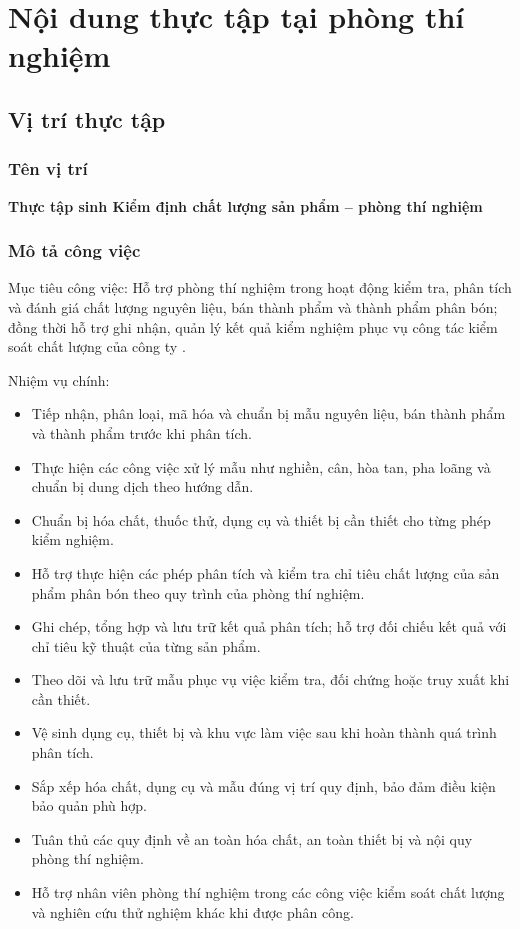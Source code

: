 \chapter{Nội dung thực tập tại phòng thí nghiệm}
\section{Vị trí thực tập}
\subsection{Tên vị trí}
\textbf{Thực tập sinh Kiểm định chất lượng sản phẩm -- phòng thí nghiệm}

\subsection{Mô tả công việc}
Mục tiêu công việc: Hỗ trợ phòng thí nghiệm trong hoạt động kiểm tra, phân tích và đánh giá chất lượng nguyên liệu, bán thành phẩm và thành phẩm phân bón; đồng thời hỗ trợ ghi nhận, quản lý kết quả kiểm nghiệm phục vụ công tác kiểm soát chất lượng của công ty \cite{company-internal-documents}.

Nhiệm vụ chính:
\begin{itemize}
  \item Tiếp nhận, phân loại, mã hóa và chuẩn bị mẫu nguyên liệu, bán thành phẩm và thành phẩm trước khi phân tích.
  \item Thực hiện các công việc xử lý mẫu như nghiền, cân, hòa tan, pha loãng và chuẩn bị dung dịch theo hướng dẫn.
  \item Chuẩn bị hóa chất, thuốc thử, dụng cụ và thiết bị cần thiết cho từng phép kiểm nghiệm.
  \item Hỗ trợ thực hiện các phép phân tích và kiểm tra chỉ tiêu chất lượng của sản phẩm phân bón theo quy trình của phòng thí nghiệm.
  \item Ghi chép, tổng hợp và lưu trữ kết quả phân tích; hỗ trợ đối chiếu kết quả với chỉ tiêu kỹ thuật của từng sản phẩm.
  \item Theo dõi và lưu trữ mẫu phục vụ việc kiểm tra, đối chứng hoặc truy xuất khi cần thiết.
  \item Vệ sinh dụng cụ, thiết bị và khu vực làm việc sau khi hoàn thành quá trình phân tích.
  \item Sắp xếp hóa chất, dụng cụ và mẫu đúng vị trí quy định, bảo đảm điều kiện bảo quản phù hợp.
  \item Tuân thủ các quy định về an toàn hóa chất, an toàn thiết bị và nội quy phòng thí nghiệm.
  \item Hỗ trợ nhân viên phòng thí nghiệm trong các công việc kiểm soát chất lượng và nghiên cứu thử nghiệm khác khi được phân công.
\end{itemize}

